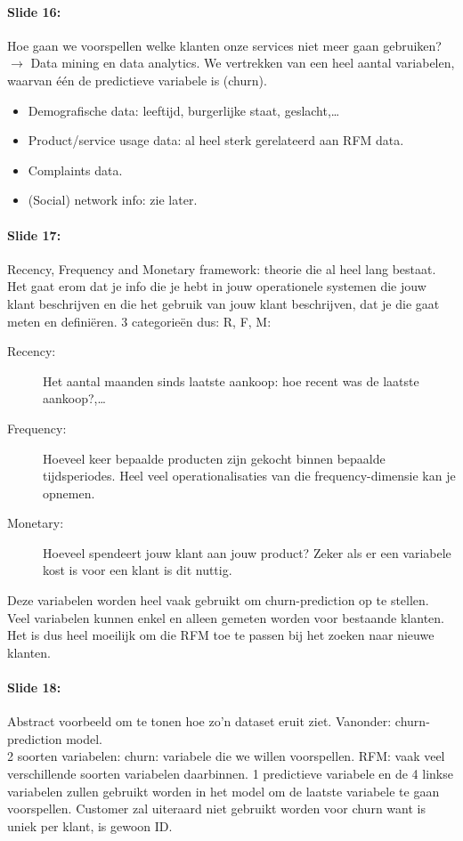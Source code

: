 \documentclass[10pt,a4paper]{report}
\begin{document}
\paragraph{Slide 16:}Hoe gaan we voorspellen welke klanten onze services niet meer gaan gebruiken? $\rightarrow$ Data mining en data analytics. We vertrekken van een heel aantal variabelen, waarvan \'e\'en de predictieve variabele is (churn).
\begin{itemize}
\item Demografische data: leeftijd, burgerlijke staat, geslacht,…
\item Product/service usage data: al heel sterk gerelateerd aan RFM data.
\item Complaints data.
\item (Social) network info: zie later.
\end{itemize}

\paragraph{Slide 17:}Recency, Frequency and Monetary framework: theorie die al heel lang bestaat. Het gaat erom dat je info die je hebt in jouw operationele systemen die jouw klant beschrijven en die het gebruik van jouw klant beschrijven, dat je die gaat meten en definiëren. 3 categorieën dus: R, F, M:
\begin{description}
\item[Recency:]Het aantal maanden sinds laatste aankoop: hoe recent was de laatste aankoop?,…
\item[Frequency:]Hoeveel keer bepaalde producten zijn gekocht binnen bepaalde tijdsperiodes. Heel veel operationalisaties van die frequency-dimensie kan je opnemen.
\item[Monetary:]Hoeveel spendeert jouw klant aan jouw product? Zeker als er een variabele kost is voor een klant is dit nuttig.
\end{description}
Deze variabelen worden heel vaak gebruikt om churn-prediction op te stellen. Veel variabelen kunnen enkel en alleen gemeten worden voor bestaande klanten. Het is dus heel moeilijk om die RFM toe te passen bij het zoeken naar nieuwe klanten.

\paragraph{Slide 18:}Abstract voorbeeld om te tonen hoe zo'n dataset eruit ziet. Vanonder: churn-prediction model.\\
2 soorten variabelen: churn: variabele die we willen voorspellen. RFM: vaak veel verschillende soorten variabelen daarbinnen. 1 predictieve variabele en de 4 linkse variabelen zullen gebruikt worden in het model om de laatste variabele te gaan voorspellen. Customer zal uiteraard niet gebruikt worden voor churn want is uniek per klant, is gewoon ID.
\end{document}

